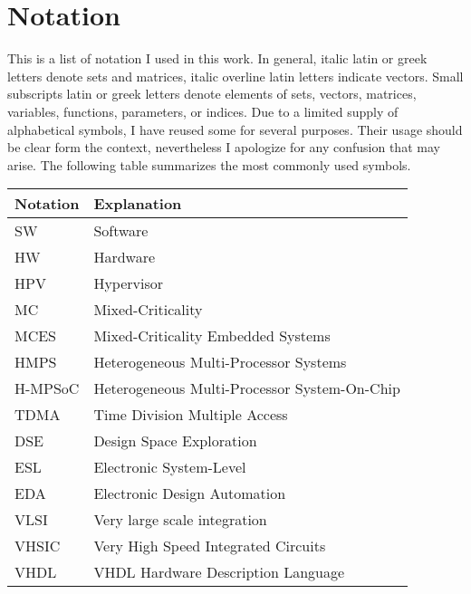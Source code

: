 \chapter*{\centering Notation}  

This is a list of notation I used in this work. In general, italic latin or greek letters denote sets and matrices, italic overline latin letters indicate vectors. Small subscripts latin or greek letters denote elements of sets, vectors, matrices, variables, functions, parameters, or indices. Due to a limited supply of alphabetical symbols, I have reused some for several purposes. Their usage should be clear form the context, nevertheless I apologize for any confusion that may arise. 
The following table summarizes the most commonly used symbols.
%
\begin{center}
\small
\begin{longtable}{ll}%
\hline
 \textbf{Notation}   & \textbf{Explanation} \\ \hline
 \endhead
 \hline
 \endfoot
    SW                                      & Software \\
    HW                                      & Hardware \\
    HPV                                     & Hypervisor \\
    MC                                      & Mixed-Criticality \\
    MCES                                    & Mixed-Criticality Embedded Systems \\
    HMPS                                   & Heterogeneous Multi-Processor Systems \\
    H-MPSoC                                & Heterogeneous Multi-Processor System-On-Chip \\
    TDMA                                    & Time Division Multiple Access \\
    DSE                                     & Design Space Exploration \\
    ESL                                     & Electronic System-Level \\
    EDA                                     & Electronic Design Automation \\
    VLSI                                    & Very large scale integration \\
    VHSIC														& Very High Speed Integrated Circuits \\
    VHDL														& VHDL Hardware Description Language \\

\end{longtable}
\end{center}
